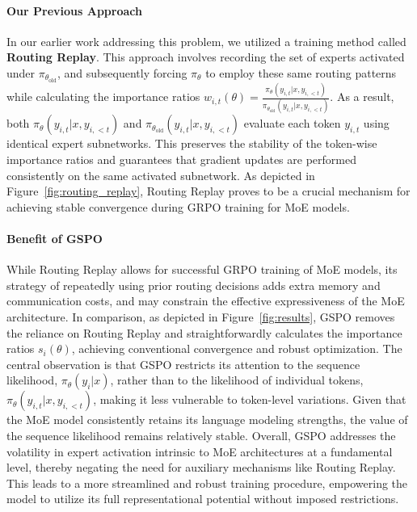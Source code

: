 \paragraph{Our Previous Approach} In our earlier work addressing this problem, we utilized a training method called \textbf{Routing Replay}. This approach involves recording the set of experts activated under $\pi_{\theta_\text{old}}$, and subsequently forcing $\pi_{\theta}$ to employ these same routing patterns while calculating the importance ratios $w_{i,t}(\theta) = \frac{ \pi_{\theta} (y_{i,t} | x, y_{i,<t}) }{ \pi_{\theta_\text{old}} (y_{i,t} | x,y_{i,<t})}$. As a result, both $\pi_{\theta} (y_{i,t} | x, y_{i,<t})$ and $\pi_{\theta_\text{old}} (y_{i,t} | x, y_{i,<t})$ evaluate each token $y_{i,t}$ using identical expert subnetworks. This preserves the stability of the token-wise importance ratios and guarantees that gradient updates are performed consistently on the same activated subnetwork. As depicted in Figure~\ref{fig:routing_replay}, Routing Replay proves to be a crucial mechanism for achieving stable convergence during GRPO training for MoE models.

\paragraph{Benefit of GSPO} While Routing Replay allows for successful GRPO training of MoE models, its strategy of repeatedly using prior routing decisions adds extra memory and communication costs, and may constrain the effective expressiveness of the MoE architecture. In comparison, as depicted in Figure~\ref{fig:results}, GSPO removes the reliance on Routing Replay and straightforwardly calculates the importance ratios $s_i(\theta)$, achieving conventional convergence and robust optimization. The central observation is that GSPO restricts its attention to the sequence likelihood, $\pi_{\theta} (y_i | x)$, rather than to the likelihood of individual tokens, $\pi_{\theta} (y_{i,t} | x, y_{i,<t})$, making it less vulnerable to token-level variations. Given that the MoE model consistently retains its language modeling strengths, the value of the sequence likelihood remains relatively stable. Overall, GSPO addresses the volatility in expert activation intrinsic to MoE architectures at a fundamental level, thereby negating the need for auxiliary mechanisms like Routing Replay. This leads to a more streamlined and robust training procedure, empowering the model to utilize its full representational potential without imposed restrictions.


